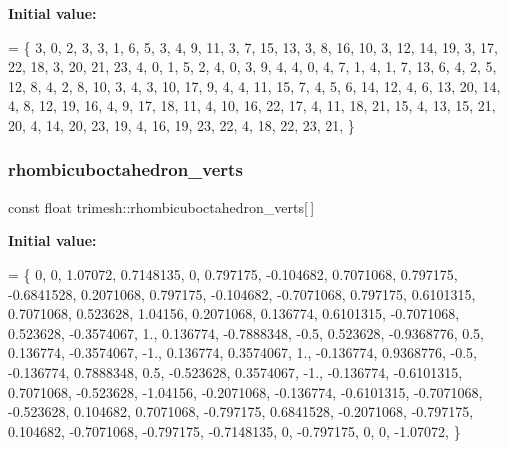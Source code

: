 {\bfseries Initial value\+:}
\begin{DoxyCode}
= \{
    3, 0, 2, 3,
    3, 1, 6, 5,
    3, 4, 9, 11,
    3, 7, 15, 13,
    3, 8, 16, 10,
    3, 12, 14, 19,
    3, 17, 22, 18,
    3, 20, 21, 23,
    4, 0, 1, 5, 2,
    4, 0, 3, 9, 4,
    4, 0, 4, 7, 1,
    4, 1, 7, 13, 6,
    4, 2, 5, 12, 8,
    4, 2, 8, 10, 3,
    4, 3, 10, 17, 9,
    4, 4, 11, 15, 7,
    4, 5, 6, 14, 12,
    4, 6, 13, 20, 14,
    4, 8, 12, 19, 16,
    4, 9, 17, 18, 11,
    4, 10, 16, 22, 17,
    4, 11, 18, 21, 15,
    4, 13, 15, 21, 20,
    4, 14, 20, 23, 19,
    4, 16, 19, 23, 22,
    4, 18, 22, 23, 21,
\}
\end{DoxyCode}
\mbox{\label{namespacetrimesh_a36509c074cecc86d1087c3ecdffb1ff4}} 
\subsubsection{\texorpdfstring{rhombicuboctahedron\+\_\+verts}{rhombicuboctahedron\_verts}}
{\footnotesize\ttfamily const float trimesh\+::rhombicuboctahedron\+\_\+verts\mbox{[}$\,$\mbox{]}\hspace{0.3cm}{\ttfamily [static]}}

{\bfseries Initial value\+:}
\begin{DoxyCode}
= \{
    0, 0, 1.07072,
    0.7148135, 0, 0.797175,
    -0.104682, 0.7071068, 0.797175,
    -0.6841528, 0.2071068, 0.797175,
    -0.104682, -0.7071068, 0.797175,
    0.6101315, 0.7071068, 0.523628,
    1.04156, 0.2071068, 0.136774,
    0.6101315, -0.7071068, 0.523628,
    -0.3574067, 1., 0.136774,
    -0.7888348, -0.5, 0.523628,
    -0.9368776, 0.5, 0.136774,
    -0.3574067, -1., 0.136774,
    0.3574067, 1., -0.136774,
    0.9368776, -0.5, -0.136774,
    0.7888348, 0.5, -0.523628,
    0.3574067, -1., -0.136774,
    -0.6101315, 0.7071068, -0.523628,
    -1.04156, -0.2071068, -0.136774,
    -0.6101315, -0.7071068, -0.523628,
    0.104682, 0.7071068, -0.797175,
    0.6841528, -0.2071068, -0.797175,
    0.104682, -0.7071068, -0.797175,
    -0.7148135, 0, -0.797175,
    0, 0, -1.07072,
\}
\end{DoxyCode}
\mbox{\label{namespacetrimesh_a4c96aacc9c374918727214fbb25fc151}} 
